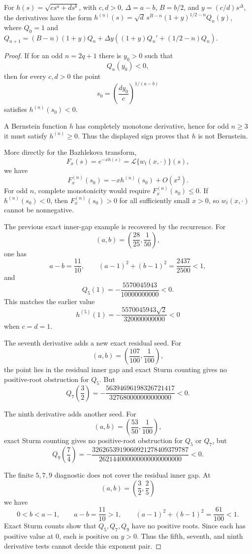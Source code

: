 \begin{proposition}
\label{res:bazhlekova-odd-derivative-polynomial-normal-form}
For \(h(s)=\sqrt{c s^a+d s^b}\), with \(c,d>0\), \(\Delta=a-b\), \(B=b/2\), and \(y=(c/d)s^\Delta\), the derivatives have the form \(h^{(n)}(s)=\sqrt d\,s^{B-n}(1+y)^{1/2-n}Q_n(y)\), where \(Q_0=1\) and \(Q_{n+1}=(B-n)(1+y)Q_n+\Delta y((1+y)Q_n'+(1/2-n)Q_n)\).
\end{proposition}
\begin{proof}
If for an odd \(n=2q+1\) there is \(y_0>0\) such that
\[
Q_n(y_0)<0,
\]
then for every \(c,d>0\) the point
\[
s_0=\left(\frac{d y_0}{c}\right)^{1/(a-b)}
\]
satisfies \(h^{(n)}(s_0)<0\).

A Bernstein function \(h\) has completely monotone derivative, hence for odd \(n\ge3\) it must satisfy \(h^{(n)}\ge0\). Thus the displayed sign proves that \(h\) is not Bernstein.

More directly for the Bazhlekova transform,
\[
F_x(s)=e^{-x h(s)}=\mathcal L\{w_t(x,\cdot)\}(s),
\]
we have
\[
F_x^{(n)}(s_0)=-x h^{(n)}(s_0)+O(x^2).
\]
For odd \(n\), complete monotonicity would require \(F_x^{(n)}(s_0)\le0\). If \(h^{(n)}(s_0)<0\), then \(F_x^{(n)}(s_0)>0\) for all sufficiently small \(x>0\), so \(w_t(x,\cdot)\) cannot be nonnegative.

The previous exact inner-gap example is recovered by the recurrence. For
\[
(a,b)=\left(\frac{28}{25},\frac1{50}\right),
\]
one has
\[
a-b=\frac{11}{10},\qquad
(a-1)^2+(b-1)^2=\frac{2437}{2500}<1,
\]
and
\[
Q_5(1)=-\frac{5570045943}{10000000000}<0.
\]
This matches the earlier value
\[
h^{(5)}(1)
=-\frac{5570045943\sqrt2}{320000000000}<0
\]
when \(c=d=1\).

The seventh derivative adds a new exact residual seed. For
\[
(a,b)=\left(\frac{107}{100},\frac1{100}\right),
\]
the point lies in the residual inner gap and exact Sturm counting gives no positive-root obstruction for \(Q_5\). But
\[
Q_7\left(\frac32\right)
=-\frac{56394696198326721417}{327680000000000000}<0.
\]

The ninth derivative adds another seed. For
\[
(a,b)=\left(\frac{53}{50},\frac1{100}\right),
\]
exact Sturm counting gives no positive-root obstruction for \(Q_5\) or \(Q_7\), but
\[
Q_9\left(\frac74\right)
=-\frac{3262653919060921278409379787}
{262144000000000000000000}<0.
\]

The finite \(5,7,9\) diagnostic does not cover the residual inner gap. At
\[
(a,b)=\left(\frac32,\frac25\right)
\]
we have
\[
0<b<a-1,\qquad a-b=\frac{11}{10}>1,\qquad
(a-1)^2+(b-1)^2=\frac{61}{100}<1.
\]
Exact Sturm counts show that \(Q_5,Q_7,Q_9\) have no positive roots. Since each has positive value at \(0\), each is positive on \(y>0\). Thus the fifth, seventh, and ninth derivative tests cannot decide this exponent pair.


\end{proof}
